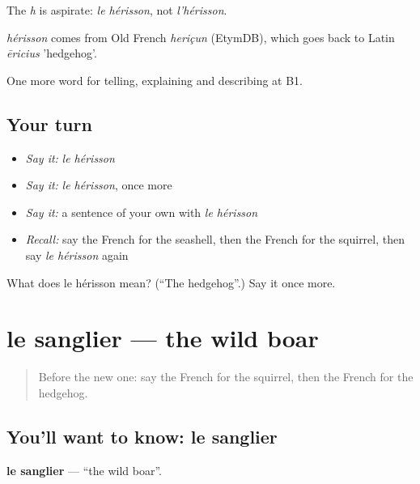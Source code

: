 The \emph{h} is aspirate: \emph{le hérisson}, not \emph{l'hérisson}.

\begin{cousinweb}
\emph{hérisson} comes from Old French \emph{heriçun} (EtymDB), which goes back to Latin \emph{ēricius} 'hedgehog'.
\end{cousinweb}

\begin{grammarlens}[title={What you've built}]
One more word for telling, explaining and describing at B1.
\end{grammarlens}

\subsection*{Your turn}
\begin{itemize}
\raggedright
  \item \emph{Say it:} \emph{le hérisson}
  \item \emph{Say it:} \emph{le hérisson}, once more
  \item \emph{Say it:} a sentence of your own with \emph{le hérisson}
  \item \emph{Recall:} say the French for the seashell, then the French for the squirrel, then say \emph{le hérisson} again
\end{itemize}

\begin{tcolorbox}[breakable,colback=teal!4,colframe=teal!35!black,title={Before you move on}]
What does le hérisson mean? (\textquotedblleft{}The hedgehog\textquotedblright{}.) Say it once more.
\end{tcolorbox}
\section[le sanglier]{le sanglier — the wild boar}

\label{lesson:FR-C459-sanglier}



\begin{quote}
Before the new one: say the French for the squirrel, then the French for the hedgehog.
\end{quote}

\subsection*{You'll want to know: le sanglier}
\textbf{le sanglier} — \textquotedblleft{}the wild boar\textquotedblright{}.

